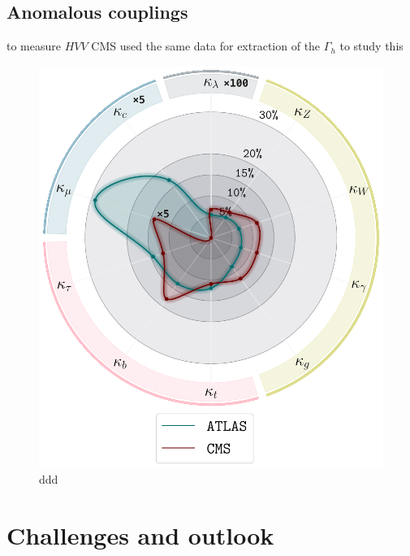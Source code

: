 \subsection{Anomalous couplings }
to measure $HVV$ CMS used the same data for extraction of the $\Gamma_h$ to study this~\cite{CMS:2019ekd}
\newpage
\begin{figure}[t!]
	\begin{center}
		\includegraphics[width=12cm]{figures/Higgs_couplings_poster}
		\caption{ddd  \label{fig:higgs_kappa}}
	\end{center}
\end{figure}
\section{Challenges and outlook \label{sec:Higgscouplchallenge} }
